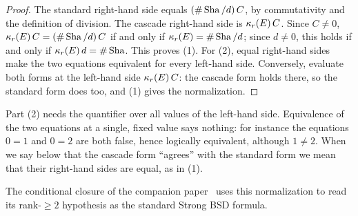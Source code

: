 \begin{proof}
The standard right-hand side equals $(\#\operatorname{Sha}/d)\,C$, by commutativity and
the definition of division.  The cascade right-hand side is
$\kappa_r(E)\,C$.  Since $C\neq0$, $\kappa_r(E)\,C=(\#\operatorname{Sha}/d)\,C$ if and only if
$\kappa_r(E)=\#\operatorname{Sha}/d$; since $d\neq0$, this holds if and only if
$\kappa_r(E)\,d=\#\operatorname{Sha}$.  This proves (1).  For (2), equal right-hand sides
make the two equations equivalent for every left-hand side.  Conversely,
evaluate both forms at the left-hand side $\kappa_r(E)\,C$: the cascade form
holds there, so the standard form does too, and (1) gives the
normalization.
\end{proof}

Part (2) needs the quantifier over all values of the left-hand side.
Equivalence of the two equations at a single, fixed value says nothing:
for instance the equations $0=1$ and $0=2$ are both false, hence
logically equivalent, although $1\neq2$.  When we say below that the
cascade form ``agrees'' with the standard form we mean that their
right-hand sides are equal, as in (1).

The conditional closure of the companion paper~\citep{TsiokosBSDClosure2026}
uses this normalization to read its rank-$\ge2$ hypothesis as the
standard Strong BSD formula.
